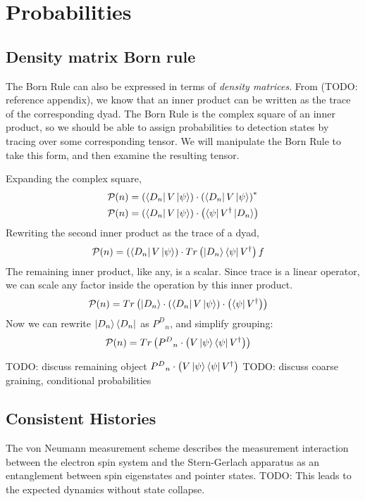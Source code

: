 \chapter{Probabilities}
\section{Density matrix Born rule}
The Born Rule can also be expressed in terms of \textit{density matrices}. From (TODO: reference appendix), we know that an inner product can be written as the trace of the corresponding dyad. The Born Rule is the complex square of an inner product, so we should be able to assign probabilities to detection states by tracing over some corresponding tensor. We will manipulate the Born Rule to take this form, and then examine the resulting tensor.

Expanding the complex square,
\begin{align}
  \mathcal{P}(n) &= \left(\bra{D_n}V\ket{\psi}\right) \cdot \left(\bra{D_n}V\ket{\psi}\right)^* \\
  \mathcal{P}(n) &= \left(\bra{D_n}V\ket{\psi}\right) \cdot \left(\bra{\psi}V^\dagger\ket{D_n}\right)
\end{align}
Rewriting the second inner product as the trace of a dyad,
\begin{align}
  \mathcal{P}(n) &= \left(\bra{D_n}V\ket{\psi}\right) \cdot Tr\left(\ket{D_n}\bra{\psi}V^\dagger\right)f
\end{align}
The remaining inner product, like any, is a scalar. Since trace is a linear operator, we can scale any factor inside the operation by this inner product.
\begin{align}
  \mathcal{P}(n) &= Tr\left(\ket{D_n} \cdot \left(\bra{D_n}V\ket{\psi}\right) \cdot \left(\bra{\psi}V^\dagger\right)\right)
\end{align}
Now we can rewrite $\ket{D_n}\bra{D_n}$ as ${P^D}_n$, and simplify grouping:
\begin{align}
  \mathcal{P}(n) &= Tr\left({P^D}_n \cdot \left(V\ket{\psi}\bra{\psi}V^\dagger\right)\right)
\end{align}

TODO: discuss remaining object ${P^D}_n \cdot \left(V\ket{\psi}\bra{\psi}V^\dagger\right)$
TODO: discuss coarse graining, conditional probabilities
\section{Consistent Histories}
The von Neumann measurement scheme describes the measurement interaction between the electron spin system and the Stern-Gerlach apparatus as an entanglement between spin eigenstates and pointer states. TODO: This leads to the expected dynamics without state collapse.

